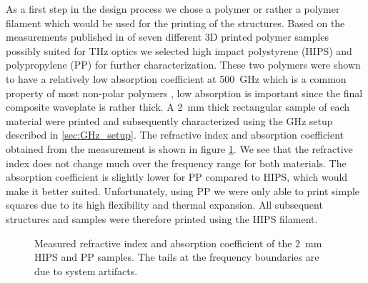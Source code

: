 As a first step in the design process we chose a polymer or rather a polymer filament which would be used for the printing of the structures. Based on the measurements published in \cite{Busch2014} of seven different 3D printed polymer samples possibly suited for THz optics we selected high impact polystyrene (HIPS) and polypropylene (PP) for further characterization. These two polymers were shown to have a relatively low absorption coefficient at \SI{500}{\giga \hertz} which is a common property of most non-polar polymers \cite{Jordens2010, Castro-Camus2020}, low absorption is important since the final composite waveplate is rather thick. A \SI{2}{\milli \meter} thick rectangular sample of each material were printed and subsequently characterized using the GHz setup described in \ref{sec:GHz_setup}. The refractive index and absorption coefficient obtained from the measurement is shown in figure \ref{fig:HIPS_PP_ri}. We see that the refractive index does not change much over the frequency range for both materials. The absorption coefficient is slightly lower for PP compared to HIPS, which would make it better suited. Unfortunately, using PP we were only able to print simple squares due to its high flexibility and thermal expansion. All subsequent structures and samples were therefore printed using the HIPS filament.

\begin{figure}[H]
    \centering
    
    \caption{Measured refractive index and absorption coefficient of the \SI{2}{\milli \meter} HIPS and PP samples. The tails at the frequency boundaries are due to system artifacts.}
    \label{fig:HIPS_PP_ri}
\end{figure}

